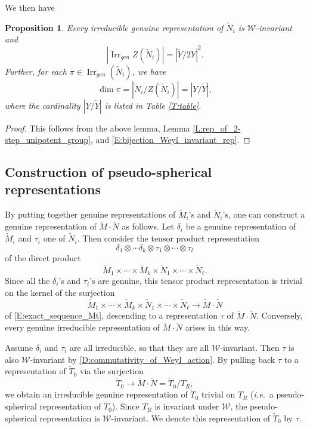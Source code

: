 \documentclass[10pt, letterpaper]{amsart}
\theoremstyle{plain}
\newtheorem{Prop}[equation]{Proposition}
\theoremstyle{definition}
\numberwithin{equation}{section}
\newcommand{\Mt}{\widetilde{M}}
\newcommand{\Nt}{\widetilde{N}}
\newcommand{\Tt}{\widetilde{T}}
\newcommand{\Yt}{\widetilde{Y}}
\newcommand{\Irr}{\operatorname{Irr}}
\newcommand{\Wcal}{\mathcal{W}}
\newcommand{\ie}{{\it i.e.}\ }
\begin{document}
We then have
\begin{Prop}\label{P:W-invariant_rep_of_Nt}
Every irreducible genuine representation of $\Nt_i$ is $\Wcal$-invariant and 
\[
\left|\Irr_{gen}Z(\Nt_i)\right|=\left|\Yt\slash 2Y\right|^2.
\]
Further, for each $\pi\in \Irr_{gen}(\Nt_i)$, we have
\[
\dim\pi=\left|\Nt_i\slash Z(\Nt_i)\right|=\left|Y\slash\Yt\right|,
\]
where the cardinality $\left|Y\slash\Yt\right|$ is listed in Table \ref{T:table}.
\end{Prop}
\begin{proof}
This follows from the above lemma, Lemma \ref{L:rep_of_2-step_unipotent_group}, and \eqref{E:bijection_Weyl_invariant_rep}.
\end{proof}


\subsection{Construction of pseudo-spherical representations}\label{SSPSpherT}


By putting together genuine representations of $\Mt_i$'s and $\Nt_i$'s, one can construct a genuine representation of $\Mt\cdot\Nt$ as follows. Let $\delta_i$ be a genuine representation of $\Mt_i$ and $\tau_i$ one of $\Nt_i$. Then consider the tensor product representation
\[
\delta_1\otimes\cdots\delta_k\otimes\tau_1\otimes\cdots\otimes \tau_{\ell}
\]
of the direct product
\[
\Mt_1\times\cdots\times\Mt_k\times \Nt_1\times\cdots\times\Nt_{\ell}.
\]
Since all the $\delta_i$'s and $\tau_i$'s are genuine, this tensor product representation is trivial on the kernel of the surjection 
\[
\Mt_1\times\cdots\times\Mt_k\times \Nt_1\times\cdots\times\Nt_{\ell}\longrightarrow \Mt\cdot\Nt
\]
of \eqref{E:exact_sequence_Mt}, descending to a representation $\tau$ of $\Mt\cdot\Nt$. Conversely, every genuine irreducible representation of $\Mt\cdot\Nt$ arises in this way.


Assume $\delta_i$ and $\tau_i$ are all irreducible, so that they are all $\Wcal$-invariant. Then $\tau$ is also $\Wcal$-invariant by \eqref{D:commutativity_of_Weyl_action}. By pulling back $\tau$ to a representation of $\Tt_{0}$ via the surjection
\[
\Tt_{0}\longrightarrow \Mt\cdot\Nt=\Tt_{0}\slash T_{R},
\]
we obtain an irreducible genuine representation of $\Tt_{0}$ trivial on $T_{R}$ (\ie a pseudo-spherical representation of $\Tt_{0}$). Since $T_{R}$ is invariant under $\Wcal$, the pseudo-spherical representation is $\Wcal$-invariant. We denote this representation of $\Tt_{0}$ by $\tau$. 
\end{document}
